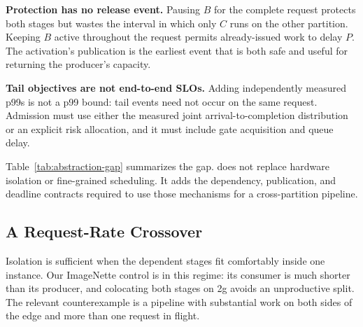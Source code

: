 \textbf{Protection has no release event.}
Pausing $B$ for the complete request protects both stages but wastes the
interval in which only $C$ runs on the other partition.  Keeping $B$ active
throughout the request permits already-issued work to delay $P$.  The
activation's publication is the earliest event that is both safe and useful
for returning the producer's capacity.

\textbf{Tail objectives are not end-to-end SLOs.}
Adding independently measured p99s is not a p99 bound: tail events need not
occur on the same request.  Admission must use either the measured joint
arrival-to-completion distribution or an explicit risk allocation, and it
must include gate acquisition and queue delay.

\begin{table}[t]
  \centering
  \small
  \caption{Scheduling scope under the dependent two-stage contract.  A cross
  means that the abstraction does not expose the property as a first-class
  contract; it does not preclude composing additional software around it.}
  \label{tab:abstraction-gap}
\end{table}

Table~\ref{tab:abstraction-gap} summarizes the gap.  \sys does not replace
hardware isolation or fine-grained scheduling.  It adds the dependency,
publication, and deadline contracts required to use those mechanisms for a
cross-partition pipeline.

\subsection{A Request-Rate Crossover}

Isolation is sufficient when the dependent stages fit comfortably inside one
instance.  Our ImageNette control is in this regime: its consumer is much
shorter than its producer, and colocating both stages on 2g avoids an
unproductive split.  The relevant counterexample is a pipeline with substantial
work on both sides of the edge and more than one request in flight.


